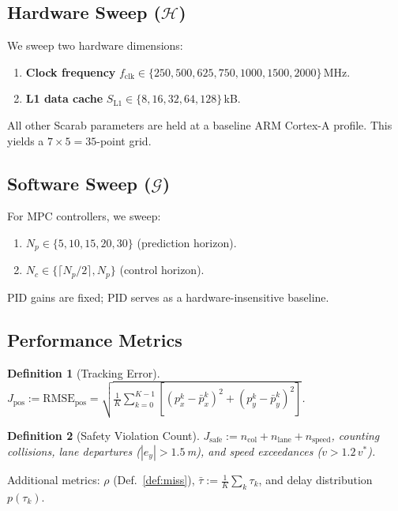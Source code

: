 \documentclass[conference]{IEEEtran}
\newcommand{\RMSE}{\mathrm{RMSE}}
\newcommand{\calH}{\mathcal{H}}
\newcommand{\calG}{\mathcal{G}}
\newtheorem{definition}{Definition}
\begin{document}
\subsection{Hardware Sweep ($\calH$)}

We sweep two hardware dimensions:
\begin{enumerate}
  \item \textbf{Clock frequency}
    $f_\text{clk} \in \{250, 500, 625, 750, 1000, 1500, 2000\}$\,MHz.
  \item \textbf{L1 data cache}
    $S_\text{L1} \in \{8, 16, 32, 64, 128\}$\,kB.
\end{enumerate}
All other Scarab parameters are held at a baseline ARM Cortex-A
profile.  This yields a $7 \times 5 = 35$-point grid.

\subsection{Software Sweep ($\calG$)}

For MPC controllers, we sweep:
\begin{enumerate}
  \item $N_p \in \{5, 10, 15, 20, 30\}$ (prediction horizon).
  \item $N_c \in \{\lceil N_p/2\rceil, N_p\}$ (control horizon).
\end{enumerate}
PID gains are fixed; PID serves as a hardware-insensitive baseline.

\subsection{Performance Metrics}

\begin{definition}[Tracking Error]\label{def:rmse}
  $J_\text{pos} := \RMSE_\text{pos} =
  \sqrt{\frac{1}{K}\sum_{k=0}^{K-1}
  [(p_x^k - \bar{p}_x^k)^2 + (p_y^k - \bar{p}_y^k)^2]}$.
\end{definition}

\begin{definition}[Safety Violation Count]\label{def:safety}
  $J_\text{safe} := n_\text{col} + n_\text{lane} + n_\text{speed}$,
  counting collisions, lane departures ($|e_y| > 1.5$\,m), and
  speed exceedances ($v > 1.2\,v^*$).
\end{definition}

\noindent Additional metrics: $\rho$ (Def.~\ref{def:miss}),
$\bar{\tau} := \frac{1}{K}\sum_k \tau_k$, and delay distribution
$p(\tau_k)$.
\end{document}
